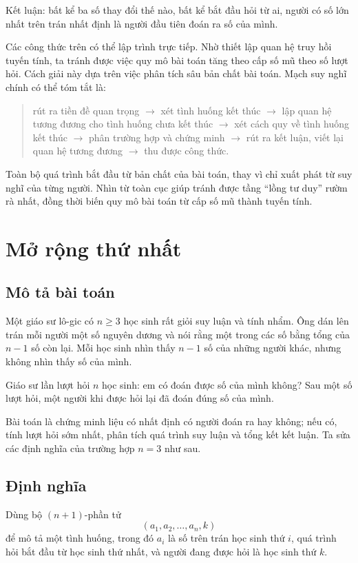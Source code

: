 \documentclass[11pt]{article}
\begin{document}
Kết luận: bất kể ba số thay đổi thế nào, bất kể bắt đầu hỏi từ ai, người có
số lớn nhất trên trán nhất định là người đầu tiên đoán ra số của mình.

Các công thức trên có thể lập trình trực tiếp. Nhờ thiết lập quan hệ truy hồi
tuyến tính, ta tránh được việc quy mô bài toán tăng theo cấp số mũ theo số
lượt hỏi. Cách giải này dựa trên việc phân tích sâu bản chất bài toán. Mạch
suy nghĩ chính có thể tóm tắt là:

\begin{quote}
rút ra tiền đề quan trọng \(\to\) xét tình huống kết thúc \(\to\) lập quan
hệ tương đương cho tình huống chưa kết thúc \(\to\) xét cách quy về tình
huống kết thúc \(\to\) phân trường hợp và chứng minh \(\to\) rút ra kết
luận, viết lại quan hệ tương đương \(\to\) thu được công thức.
\end{quote}
Toàn bộ quá trình bắt đầu từ bản chất của bài toán, thay vì chỉ xuất phát từ
suy nghĩ của từng người. Nhìn từ toàn cục giúp tránh được tầng ``lồng tư
duy'' rườm rà nhất, đồng thời biến quy mô bài toán từ cấp số mũ thành tuyến
tính.

\section{Mở rộng thứ nhất}

\subsection*{Mô tả bài toán}

Một giáo sư lô-gic có \(n\ge 3\) học sinh rất giỏi suy luận và tính nhẩm.
Ông dán lên trán mỗi người một số nguyên dương và nói rằng một trong các số
bằng tổng của \(n-1\) số còn lại. Mỗi học sinh nhìn thấy \(n-1\) số của những
người khác, nhưng không nhìn thấy số của mình.

Giáo sư lần lượt hỏi \(n\) học sinh: em có đoán được số của mình không? Sau
một số lượt hỏi, một người khi được hỏi lại đã đoán đúng số của mình.

Bài toán là chứng minh liệu có nhất định có người đoán ra hay không; nếu có,
tính lượt hỏi sớm nhất, phân tích quá trình suy luận và tổng kết kết luận.
Ta sửa các định nghĩa của trường hợp \(n=3\) như sau.

\subsection*{Định nghĩa}

Dùng bộ \((n+1)\)-phần tử
\[
  (a_1,a_2,\ldots,a_n,k)
\]
để mô tả một tình huống, trong đó \(a_i\) là số trên trán học sinh thứ \(i\),
quá trình hỏi bắt đầu từ học sinh thứ nhất, và người đang được hỏi là học
sinh thứ \(k\).
\end{document}
